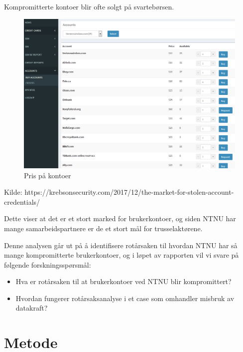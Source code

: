 Kompromitterte kontoer blir ofte solgt på svartebørsen. 
\begin{figure}[H]
    \centering
    \includegraphics[scale=0.4]{case_2/bilder/prislite_kontore.png}
    \caption[pris-kontoer]{Pris på kontoer}
    \label{fig:pris-kontoer}
\end{figure}
Kilde: https://krebsonsecurity.com/2017/12/the-market-for-stolen-account-credentials/


Dette viser at det er et stort marked for brukerkontoer, og siden NTNU har mange samarbeidspartnere er de et stort mål for trusselaktørene. 


Denne analysen går ut på å identifisere rotårsaken til hvordan NTNU har så mange kompromitterte brukerkontoer, og i løpet av rapporten vil vi svare på følgende forskningsspørsmål:
\begin{itemize}
    \item Hva er rotårsaken til at brukerkontoer ved NTNU blir kompromittert?
    \item Hvordan fungerer rotårsaksanalyse i et case som omhandler misbruk av datakraft?
\end{itemize}


\section{Metode}

